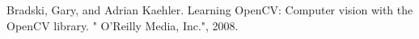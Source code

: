 \begin{thebibliography}{x}

Bradski, Gary, and Adrian Kaehler. Learning OpenCV: Computer vision with the OpenCV library. " O'Reilly Media, Inc.", 2008.

\end{thebibliography}
